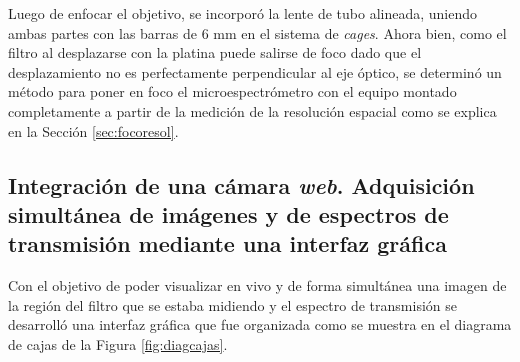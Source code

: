 \begin{figure}[H]
\begin{floatrow}
	\end{floatrow}
\end{figure}

Luego de enfocar el objetivo, se incorporó la lente de tubo alineada, uniendo ambas partes con las barras de 6 mm en el sistema de \textit{cages}. Ahora bien, como el filtro al desplazarse con la platina puede salirse de foco dado que el desplazamiento no es perfectamente perpendicular al eje óptico, se determinó un método para poner en foco el microespectrómetro con el equipo montado completamente a partir de la medición de la resolución espacial como se explica en la Sección \ref{sec:focoresol}.



\singlespacing
\subsection{Integración de una cámara \textit{web}. Adquisición simultánea de imágenes y de espectros de transmisión mediante una interfaz gráfica \href{https://github.com/jrr1984/defectsGUI}{\faGithub}}
\label{sec:camwebgui}

Con el objetivo de poder visualizar en vivo y de forma simultánea una imagen de la región del filtro que se estaba midiendo y el espectro de transmisión se desarrolló una interfaz gráfica que fue organizada como se muestra en el diagrama de cajas de la Figura \ref{fig:diagcajas}.

